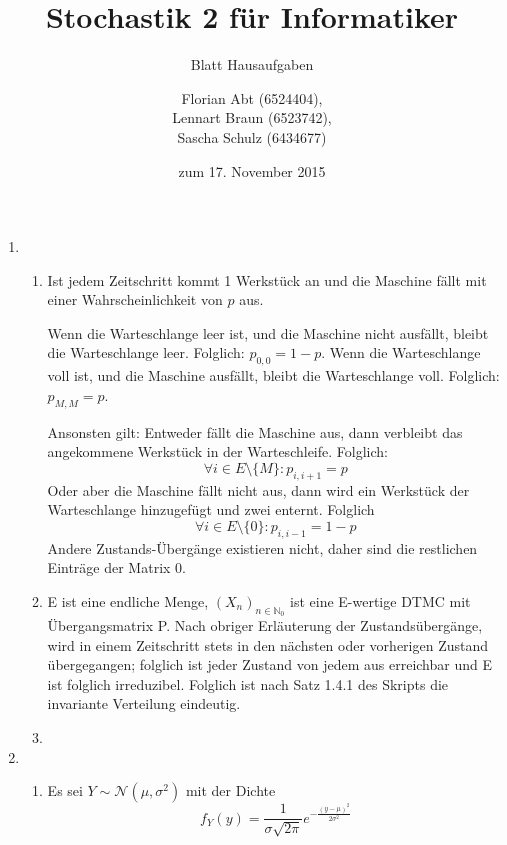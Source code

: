 \documentclass[a4paper]{scrartcl}
\title{Stochastik 2 für Informatiker}
\subtitle{Blatt {\blattnr} Hausaufgaben}
\author{
    Florian Abt (6524404), \\
    Lennart Braun (6523742), \\
    Sascha Schulz (6434677)
}
\date{zum 17. November 2015}
\newcommand{\N}{\mathbb{N}}
\def \blattnr {5}
\begin{document}
\maketitle

\begin{enumerate}[label=\bfseries \blattnr.\arabic*]
    \item
        \begin{enumerate}
            \item
	    
	    Ist jedem Zeitschritt kommt 1 Werkstück an und die Maschine fällt mit einer Wahrscheinlichkeit von $p$ aus.
	    
	    Wenn die Warteschlange leer ist, und die Maschine nicht ausfällt, bleibt die Warteschlange leer. Folglich: $p_{0,0}=1-p$.
	    Wenn die Warteschlange voll ist, und die Maschine ausfällt, bleibt die Warteschlange voll. Folglich: $p_{M,M}=p$.

	    Ansonsten gilt: Entweder fällt die Maschine aus, dann verbleibt das angekommene Werkstück in der Warteschleife. 
	    Folglich: $$\forall i \in E\setminus\{M\} \colon p_{i,i+1} = p$$ 
	    Oder aber die Maschine fällt nicht aus, dann wird ein Werkstück der Warteschlange 
	    hinzugefügt und zwei enternt. Folglich 
	    $$\forall i \in E\setminus\{0\} \colon p_{i,i-1} = 1 - p$$
	    Andere Zustands-Übergänge existieren nicht, daher sind die restlichen Einträge der Matrix 0.

            \item
            
            E ist eine endliche Menge, $(X_n)_{n\in\N_0}$ ist eine E-wertige
            DTMC mit Übergangsmatrix P. Nach obriger Erläuterung der Zustandsübergänge, wird in einem Zeitschritt stets in den nächsten 
            oder vorherigen Zustand übergegangen; folglich ist jeder Zustand von jedem aus erreichbar und E ist folglich irreduzibel. 
            Folglich ist nach Satz 1.4.1 des Skripts die invariante Verteilung eindeutig.

            \item

        \end{enumerate}
   
    \item
        \begin{enumerate}
            \item
	      Es sei $Y \sim \mathcal{N}(\mu, \sigma^2)$ mit der Dichte
	      \begin{equation*}
		  f_Y(y) = \frac1{\sigma\sqrt{2\pi}} e^{-\frac{(y-\mu)^2}{2\sigma^2}}
	      \end{equation*}
	      

\end{enumerate}
\end{enumerate}
\end{document}
